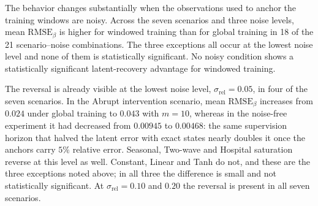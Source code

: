 The behavior changes substantially when the observations used to anchor the
training windows are noisy. Across the seven scenarios and three noise
levels, mean $\mathrm{RMSE}_{\beta}$ is higher for windowed training than
for global training in 18 of the 21 scenario--noise combinations. The three
exceptions all occur at the lowest noise level and none of them is
statistically significant. No noisy condition shows a statistically
significant latent-recovery advantage for windowed training.


%
%

The reversal is already visible at the lowest noise level,
$\sigma_{\mathrm{rel}}=0.05$, in four of the seven scenarios. In the Abrupt
intervention scenario, mean $\mathrm{RMSE}_{\beta}$ increases from $0.024$
under global training to $0.043$ with $m=10$, whereas in the noise-free
experiment it had decreased from $0.00945$ to $0.00468$: the same
supervision horizon that halved the latent error with exact states nearly
doubles it once the anchors carry $5\%$ relative error. Seasonal, Two-wave
and Hospital saturation reverse at this level as well. Constant, Linear and
Tanh do not, and these are the three exceptions noted above; in all three
the difference is small and not statistically significant. At
$\sigma_{\mathrm{rel}}=0.10$ and $0.20$ the reversal is present in all seven
scenarios.


%
%

